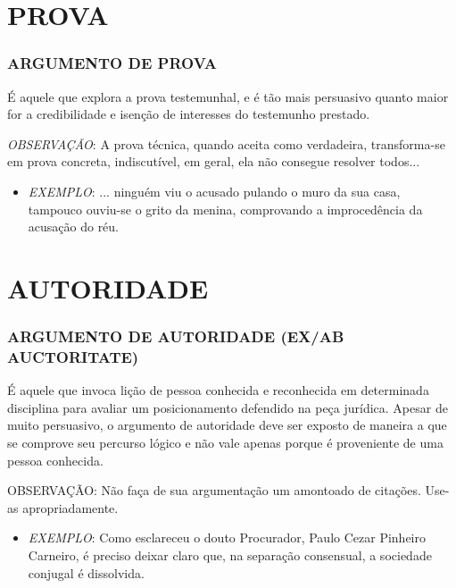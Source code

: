 \documentclass[aspectratio=1610]{beamer}
\begin{document}
\section {PROVA}
\begin{frame}
  \frametitle{ARGUMENTO DE PROVA   }
\begin{center}
É aquele que explora a prova testemunhal, e é tão mais persuasivo quanto maior for a credibilidade e isenção de interesses do testemunho prestado. 
\end{center}

\textit{OBSERVAÇÃO}: A prova técnica, quando aceita como verdadeira, transforma-se em prova concreta, indiscutível, em geral, ela não consegue resolver todos...
\begin{itemize}
  \item \textit{EXEMPLO}: ... ninguém viu o acusado pulando o muro da sua casa, tampouco ouviu-se o grito da menina, comprovando a improcedência da acusação do réu.
\end{itemize}
\end{frame}

\section {AUTORIDADE}
\begin{frame}
  \frametitle{ARGUMENTO DE AUTORIDADE (EX/AB AUCTORITATE)   }
\begin{center}
É aquele que invoca lição de pessoa conhecida e reconhecida em determinada disciplina para avaliar um posicionamento defendido na peça jurídica. Apesar de muito persuasivo, o argumento de autoridade deve ser exposto de maneira a que se comprove seu percurso lógico e não vale apenas porque é proveniente de uma pessoa conhecida.
\end{center}

OBSERVAÇÃO: Não faça de sua argumentação um amontoado de citações. Use-as apropriadamente.

\begin{itemize}
  \item \textit{EXEMPLO}: Como esclareceu o douto Procurador, Paulo Cezar Pinheiro Carneiro,  é preciso deixar claro que, na separação consensual, a sociedade conjugal é dissolvida.
\end{itemize}
\end{frame}

\end{document}
